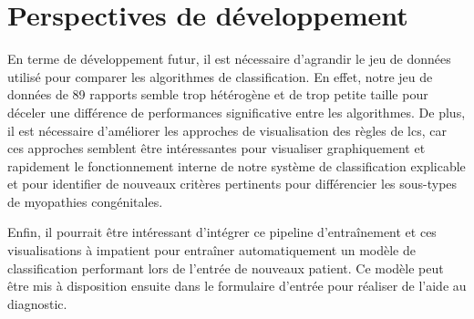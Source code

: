 \section{Perspectives de développement}
En terme de développement futur, il est nécessaire d'agrandir le jeu de données utilisé pour comparer les algorithmes de classification. En effet, notre jeu de données de 89 rapports semble trop hétérogène et de trop petite taille pour déceler une différence de performances significative entre les algorithmes. De plus, il est nécessaire d'améliorer les approches de visualisation des règles de \gls{lcs}, car ces approches semblent être intéressantes pour visualiser graphiquement et rapidement le fonctionnement interne de notre système de classification explicable et pour identifier de nouveaux critères pertinents pour différencier les sous-types de myopathies congénitales.

Enfin, il pourrait être intéressant d'intégrer ce pipeline d'entraînement et ces visualisations à \gls{impatient} pour entraîner automatiquement un modèle de classification performant lors de l'entrée de nouveaux patient. Ce modèle peut être mis à disposition ensuite dans le formulaire d'entrée pour réaliser de l'aide au diagnostic.